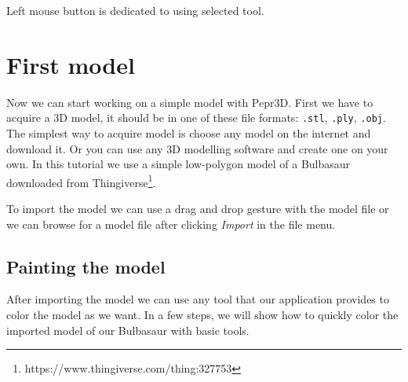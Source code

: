 Left mouse button is dedicated to using selected tool.

\section{First model}
Now we can start working on a simple model with Pepr3D. First we have to acquire a 3D model, it should be in one of these file formats: \texttt{.stl}, \texttt{.ply}, \texttt{.obj}. The simplest way to acquire model is choose any model on the internet and download it. Or you can use any 3D modelling software and create one on your own. In this tutorial we use a simple low-polygon model of a Bulbasaur downloaded from Thingiverse\footnote{https://www.thingiverse.com/thing:327753}.

To import the model we can use a drag and drop gesture with the model file or we can browse for a model file after clicking \textit{Import} in the file menu.


\subsection{Painting the model}

After importing the model we can use any tool that our application provides to color the model as we want. In a few steps, we will show how to quickly color the imported model of our Bulbasaur with basic tools.

